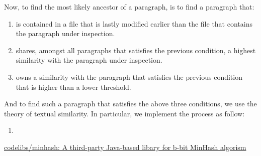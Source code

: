 \documentclass{article}
\begin{document}
Now, to find the most likely ancestor of a paragraph, is to find a paragraph that:
\begin{enumerate}
  \item is contained in a file that is lastly modified earlier than the file that contains the paragraph under inspection.
  \item shares, amongst all paragraphs that satisfies the previous condition, a highest similarity with the paragraph under inspection.
  \item owns a similarity with the paragraph that satisfies the previous condition that is higher than a lower threshold.
\end{enumerate}
And to find such a paragraph that satisfies the above three conditions, we use the theory of textual similarity. In particular, we implement the process as follow:
\begin{enumerate}
  \item
\end{enumerate}

















\begin{thebibliography}{9}
      \href{https://github.com/codelibs/minhash}{codelibs/minhash: A third-party Java-based libary  for b-bit MinHash algorism}


\end{thebibliography} %
\end{document}
